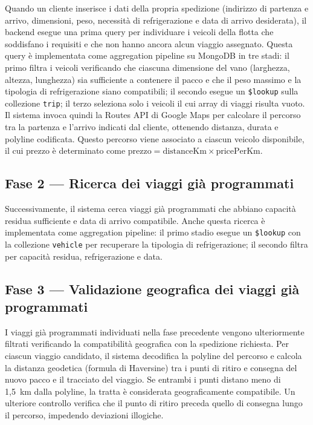 Quando un cliente inserisce i dati della propria spedizione (indirizzo di partenza e arrivo, dimensioni, peso, necessità di refrigerazione e data di arrivo desiderata), il backend esegue una prima query per individuare i veicoli della flotta che soddisfano i requisiti e che non hanno ancora alcun viaggio assegnato. Questa query è implementata come aggregation pipeline su MongoDB in tre stadi: il primo filtra i veicoli verificando che ciascuna dimensione del vano (larghezza, altezza, lunghezza) sia sufficiente a contenere il pacco e che il peso massimo e la tipologia di refrigerazione siano compatibili; il secondo esegue un \texttt{\$lookup} sulla collezione \texttt{trip}; il terzo seleziona solo i veicoli il cui array di viaggi risulta vuoto. Il sistema invoca quindi la Routes API di Google Maps per calcolare il percorso tra la partenza e l'arrivo indicati dal cliente, ottenendo distanza, durata e polyline codificata. Questo percorso viene associato a ciascun veicolo disponibile, il cui prezzo è determinato come $\text{prezzo} = \text{distanceKm} \times \text{pricePerKm}$.

\subsection{Fase 2 --- Ricerca dei viaggi già programmati}

Successivamente, il sistema cerca viaggi già programmati che abbiano capacità residua sufficiente e data di arrivo compatibile. 
Anche questa ricerca è implementata come aggregation pipeline: il primo stadio esegue un \texttt{\$lookup} con la collezione \texttt{vehicle} per recuperare la tipologia di refrigerazione; il secondo filtra per capacità residua, refrigerazione e data.

\subsection{Fase 3 --- Validazione geografica dei viaggi già programmati}

I viaggi già programmati individuati nella fase precedente vengono ulteriormente filtrati verificando la compatibilità geografica con la spedizione richiesta. 
Per ciascun viaggio candidato, il sistema decodifica la polyline del percorso e calcola la distanza geodetica (formula di Haversine) tra i punti di ritiro e consegna del nuovo pacco e il tracciato del viaggio. Se entrambi i punti distano meno di 1,5~km dalla polyline, la tratta è considerata geograficamente compatibile. Un ulteriore controllo verifica che il punto di ritiro preceda quello di consegna lungo il percorso, impedendo deviazioni illogiche.


